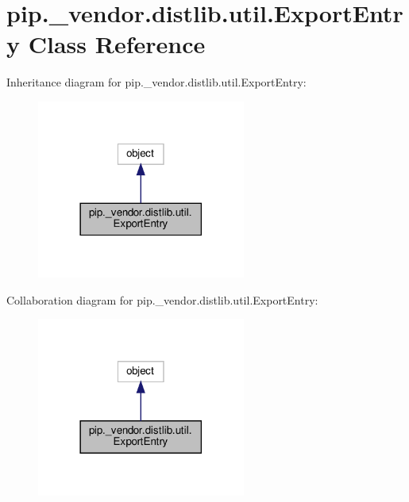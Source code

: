 \hypertarget{classpip_1_1__vendor_1_1distlib_1_1util_1_1ExportEntry}{}\section{pip.\+\_\+vendor.\+distlib.\+util.\+Export\+Entry Class Reference}
\label{classpip_1_1__vendor_1_1distlib_1_1util_1_1ExportEntry}


Inheritance diagram for pip.\+\_\+vendor.\+distlib.\+util.\+Export\+Entry\+:
\nopagebreak
\begin{figure}[H]
\begin{center}
\leavevmode
\includegraphics[width=194pt]{classpip_1_1__vendor_1_1distlib_1_1util_1_1ExportEntry__inherit__graph}
\end{center}
\end{figure}


Collaboration diagram for pip.\+\_\+vendor.\+distlib.\+util.\+Export\+Entry\+:
\nopagebreak
\begin{figure}[H]
\begin{center}
\leavevmode
\includegraphics[width=194pt]{classpip_1_1__vendor_1_1distlib_1_1util_1_1ExportEntry__coll__graph}
\end{center}
\end{figure}
